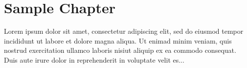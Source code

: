 \documentclass[a4paper,12pt,twoside]{book}
\begin{document}
\chapter{Sample Chapter}
\thispagestyle{empty}

Lorem ipsum dolor sit amet, consectetur adipiscing elit, sed do eiusmod tempor incididunt ut labore et dolore magna aliqua. Ut enimad minim veniam, quis nostrud exercitation ullamco laboris nisiut aliquip ex ea commodo consequat. Duis aute irure dolor in reprehenderit in voluptate velit es...
\end{document}
